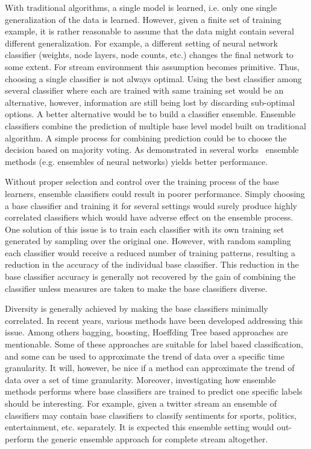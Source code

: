 With traditional algorithms, a single model is learned, i.e. only one single generalization of the data is learned. However, given a finite set of training example, it is rather reasonable to assume that the data might contain several different generalization. For example, a different setting of neural network classifier (weights, node layers, node counts, etc.) changes the final network to some extent. For stream environment this assumption becomes primitive. Thus, choosing a single classifier is not always optimal. Using the best classifier among several classifier where each are trained with same training set would be an alternative, however, information are still being lost by discarding sub-optimal options. A better alternative would be to build a classifier ensemble. Ensemble classifiers combine the prediction of multiple base level model built on traditional algorithm. A simple process for combining prediction could be to choose the decision based on majority voting. As demonstrated in several works~\cite{breiman94:bagging, schapire90:whyens} ensemble methods (e.g. ensembles of neural networks) yields better performance.

Without proper selection and control over the training process of the base learners, ensemble classifiers could result in poorer performance. Simply choosing a base classifier and training it for several settings would surely produce highly correlated classifiers which would have adverse effect on the ensemble process. One solution of this issue is to train each classifier with its own training set generated by sampling over the original one. However, with random sampling each classifier would receive a reduced number of training patterns, resulting a reduction in the accuracy of the individual base classifier. This reduction in the base classifier accuracy is generally not recovered by the gain of combining the classifier unless measures are taken to make the base classifiers diverse.

Diversity is generally achieved by making the base classifiers minimally correlated. In recent years, various methods have been developed addressing this issue. Among others bagging, boosting, Hoeffding Tree based approaches are mentionable. Some of these approaches are suitable for label based classification, and some can be used to approximate the trend of data over a specific time granularity. It will, however, be nice if a method can approximate the trend of data over a set of time granularity. Moreover, investigating how ensemble methods performs where base classifiers are trained to predict one specific labels should be interesting. For example, given a twitter stream an ensemble of classifiers may contain base classifiers to classify sentiments for sports, politics, entertainment, etc. separately. It is expected this ensemble setting would out-perform the generic ensemble approach for complete stream altogether.

